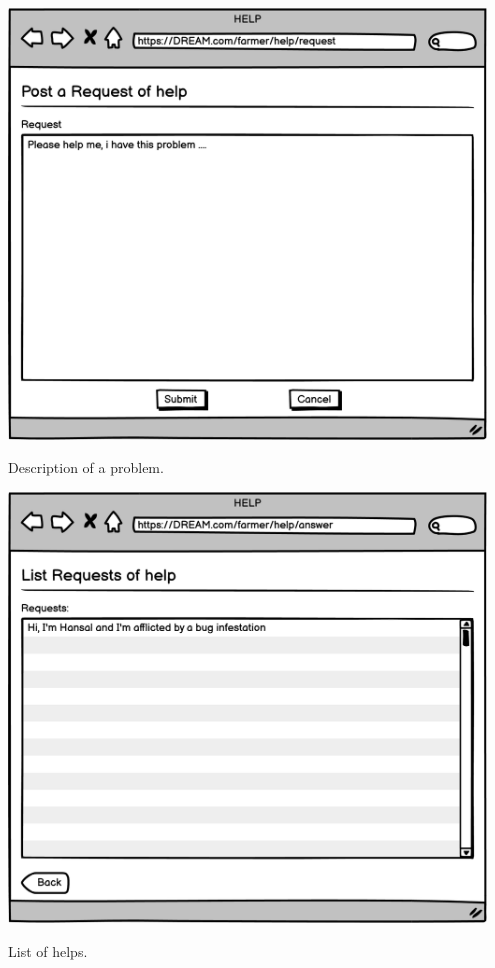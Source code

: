 \begin{minipage}{.5\textwidth}
	\centering
	\includegraphics[width=0.95\textwidth]{Images/Mockup/Farmer/05FarmerHelpAsk.png}
	\captionsetup{type=figure}
	\caption{Description of a problem.}
\end{minipage}%
\begin{minipage}{.5\textwidth}
	\centering
	\includegraphics[width=0.95\textwidth]{Images/Mockup/Farmer/06FarmerHelpAnswers.png}
	\captionsetup{type=figure}
	\caption{List of helps.}
\end{minipage}
